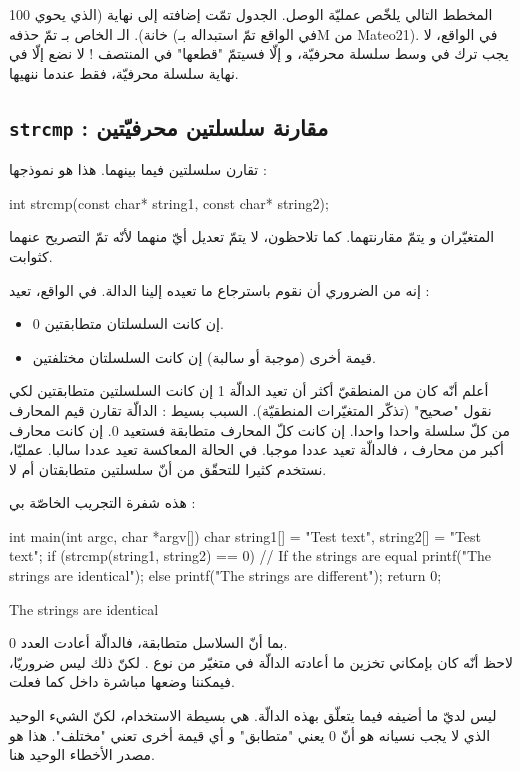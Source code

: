 المخطط التالي يلخّص عمليّة الوصل.
الجدول
تمّت إضافته إلى نهاية
(الذي يحوي 100 خانة).
الـ
الخاص بـ
تمّ حذفه (في الواقع تمّ استبداله بـ\textenglish{M} من \textenglish{Mateo21}). في الواقع، لا يجب ترك
في وسط سلسلة محرفيّة، و إلّا فسيتمّ "قطعها" في المنتصف ! لا نضع
إلّا في نهاية سلسلة محرفيّة، فقط عندما ننهيها.

\subsection{\texttt{strcmp} : مقارنة سلسلتين محرفيّتين}
تقارن سلسلتين فيما بينهما. هذا هو نموذجها :
\begin{Csource}
int strcmp(const char* string1, const char* string2);
\end{Csource}
المتغيّران
و
يتمّ مقارنتهما. كما تلاحظون، لا يتمّ تعديل أيّ منهما لأنّه تمّ التصريح عنهما كثوابت.

إنه من الضروري أن نقوم باسترجاع ما تعيده إلينا الدالة. في الواقع،  تعيد :
\begin{itemize}
  \item 0 إن كانت السلسلتان متطابقتين.
  \item قيمة أخرى (موجبة أو سالبة) إن كانت السلسلتان مختلفتين.
\end{itemize}
\begin{information}
أعلم أنّه كان من المنطقيّ أكثر أن تعيد الدالّة 1 إن كانت السلسلتين متطابقتين لكي نقول "صحيح" (تذكّر المتغيّرات المنطقيّة). السبب بسيط :
الدالّة تقارن قيم المحارف من كلّ سلسلة واحدا واحدا. إن كانت كلّ المحارف متطابقة فستعيد 0. إن كانت محارف
أكبر من محارف
،
فالدالّة تعيد عددا موجبا. في الحالة المعاكسة تعيد عددا سالبا. عمليّا، نستخدم
كثيرا للتحقّق من أنّ سلسلتين متطابقتان أم لا.
\end{information}
هذه شفرة التجريب الخاصّة بي :
\begin{Csource}
int main(int argc, char *argv[])
{
	char string1[] = "Test text", string2[] = "Test text";
	if (strcmp(string1, string2) == 0) // If the strings are equal
	{
    		printf("The strings are identical\n");
 	}
	 else
	{
    		printf("The strings are different\n");
	 }
	return 0;
}
\end{Csource}
\begin{Console}
The strings are identical
\end{Console}
بما أنّ السلاسل متطابقة، فالدالّة
أعادت العدد 0.\\
لاحظ أنّه كان بإمكاني تخزين ما أعادته الدالّة في متغيّر من نوع
.
لكنّ ذلك ليس ضروريّا، فيمكننا وضعها مباشرة داخل
كما فعلت.

ليس لديّ ما أضيفه فيما يتعلّق بهذه الدالّة. هي بسيطة الاستخدام، لكنّ الشيء الوحيد الذي لا يجب نسيانه هو أنّ 0 يعني "متطابق" و أي قيمة أخرى تعني "مختلف". هذا هو مصدر الأخطاء الوحيد هنا.
